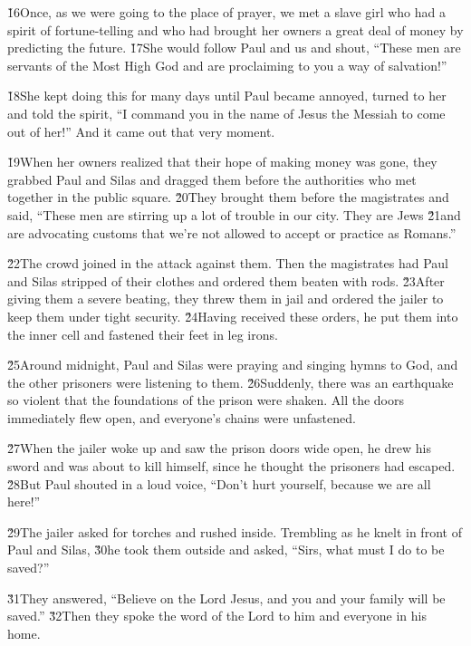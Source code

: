 \v{16}Once, as we were going to the place of prayer, we met a slave girl who had a spirit of fortune-telling and who had brought her owners a great deal of money by predicting the future. \v{17}She would follow Paul and us and shout, ``These men are servants of the Most High God and are proclaiming to you a way of salvation!''

\v{18}She kept doing this for many days until Paul became annoyed, turned to her and told the spirit, ``I command you in the name of Jesus the Messiah to come out of her!'' And it came out that very moment.

\v{19}When her owners realized that their hope of making money was gone, they grabbed Paul and Silas and dragged them before the authorities who met together in the public square. \v{20}They brought them before the magistrates and said, ``These men are stirring up a lot of trouble in our city. They are Jews \v{21}and are advocating customs that we're not allowed to accept or practice as Romans.''

\v{22}The crowd joined in the attack against them. Then the magistrates had Paul and Silas stripped of their clothes and ordered them beaten with rods. \v{23}After giving them a severe beating, they threw them in jail and ordered the jailer to keep them under tight security. \v{24}Having received these orders, he put them into the inner cell and fastened their feet in leg irons.

\v{25}Around midnight, Paul and Silas were praying and singing hymns to God, and the other prisoners were listening to them. \v{26}Suddenly, there was an earthquake so violent that the foundations of the prison were shaken. All the doors immediately flew open, and everyone's chains were unfastened.

\v{27}When the jailer woke up and saw the prison doors wide open, he drew his sword and was about to kill himself, since he thought the prisoners had escaped. \v{28}But Paul shouted in a loud voice, ``Don't hurt yourself, because we are all here!''

\v{29}The jailer asked for torches and rushed inside. Trembling as he knelt in front of Paul and Silas, \v{30}he took them outside and asked, ``Sirs, what must I do to be saved?''

\v{31}They answered, ``Believe on the Lord Jesus, and you and your family will be saved.'' \v{32}Then they spoke the word of the Lord to him and everyone in his home.

